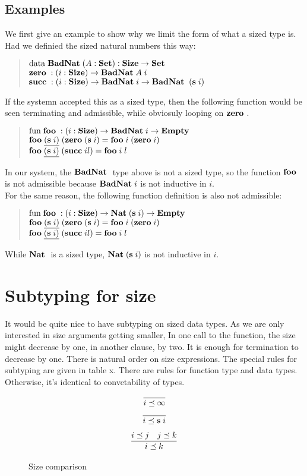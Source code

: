 \subsection{Examples}
We first give an example to show why we limit the form of what a sized type is.
Had we definied the sized natural numbers this way:
\begin{quote}
$\mathrm{data}\; \mathbf{BadNat}\; ( A : \mathbf{Set} ) : \mathbf{Size} \rightarrow \mathbf{Set} $ 
\\
$\mathbf{zero}\; : ( i : \mathbf{Size} ) \rightarrow  \mathbf{BadNat}\; A \; i $
\\
$\mathbf{succ}\; : ( i : \mathbf{Size} ) \rightarrow \mathbf{BadNat}\; i \rightarrow \mathbf{BadNat}\; \; (\mathbf{s}\; i) $
\end{quote}
If the systemn accepted this as a sized type, then the following function would be seen terminating and admissible, while obviosuly looping on $\mathbf{zero}\;$.
\begin{quote}
$\mathrm{fun}\; \mathbf{foo}\; : ( i : \mathbf{Size} ) \rightarrow \mathbf{BadNat}\; i \rightarrow \mathbf{Empty}\;$
\\
$\mathbf{foo}\; \underline{(\mathbf{s}\; i)} \; (\mathbf{zero}\; (\mathbf{s}\; i) = \mathbf{foo}\; i \; (\mathbf{zero}\; i)$
\\
$\mathbf{foo}\; \underline{(\mathbf{s}\; i)}\; (\mathbf{succ}\; i l) = \mathbf{foo}\; i \; l$
\end{quote}
In our system, the $\mathbf{BadNat}\;$ type above is not a sized type, so the function $\mathbf{foo}\;$ is not admissible because $\mathbf{BadNat}\; i$ is not inductive in $i$.\\
For the same reason, the following function definition is also not admissible:
\begin{quote}
$\mathrm{fun}\; \mathbf{foo}\; : ( i : \mathbf{Size} ) \rightarrow \mathbf{Nat}\; (\mathbf{s}\; i) \rightarrow \mathbf{Empty}\;$
\\
$\mathbf{foo}\; \underline{(\mathbf{s}\; i)} \; (\mathbf{zero}\; (\mathbf{s}\; i) = \mathbf{foo}\; i \; (\mathbf{zero}\; i)$
\\
$\mathbf{foo}\; \underline{(\mathbf{s}\; i)}\; (\mathbf{succ}\; i l) = \mathbf{foo}\; i \; l$
\end{quote}
While $\mathbf{Nat}\;$ is a sized type, $\mathbf{Nat}\; (\mathbf{s}\; i)$ is not inductive in $i$.
\section{Subtyping for size}
It would be quite nice to have subtyping on sized data types.
As we are only interested in size arguments getting smaller, 
In one call to the function, the size might decrease by one, in another clause, by two.
It is enough for termination to decrease by one.
There is natural order on size expressions.
The special rules for subtyping are given in table x.
There are rules for function type and data types.
Otherwise, it's identical to convetability of types.  
\begin{figure}[p]
\[
\begin{array}{c}
	  \infer{i \preceq \infty}
          {}
\end{array}
\]
\[
\begin{array}{c}
	  \infer{i \preceq \s i}
          {}
\end{array}
\]
\[
\begin{array}{c}
	  \infer{i \preceq k}
          {i \preceq j & j \preceq k}
\end{array}
\]
\caption{Size comparison}
\end{figure}


